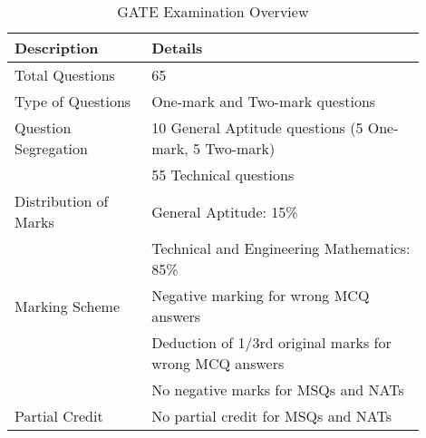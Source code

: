 \begin{table}[htbp]
    \centering
    \begin{tabular}{p{0.3\linewidth}p{0.6\linewidth}}
        \toprule
        Description           & Details                                                 \\
        \midrule
        Total Questions       & 65                                                      \\
        Type of Questions     & One-mark and Two-mark questions                         \\
        Question Segregation  & 10 General Aptitude questions (5 One-mark, 5 Two-mark)  \\
                              & 55 Technical questions                                  \\
        Distribution of Marks & General Aptitude: 15\%                                  \\
                              & Technical and Engineering Mathematics: 85\%             \\
        Marking Scheme        & Negative marking for wrong MCQ answers                  \\
                              & Deduction of 1/3rd original marks for wrong MCQ answers \\
                              & No negative marks for MSQs and NATs                     \\
        Partial Credit        & No partial credit for MSQs and NATs                     \\
        \bottomrule
    \end{tabular}
    \caption{GATE Examination Overview}
    \label{tab:gate-overview}
\end{table}
